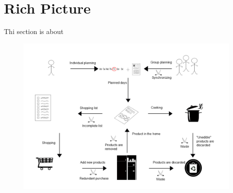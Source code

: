 \section{Rich Picture}
Thi section is about 


\begin{figure}[H]
	\centering
	\includegraphics[width=1.00\textwidth]{Grafik/FoodPlanner/InkscapeTegninger/RigtBillede.png}
\end{figure}
